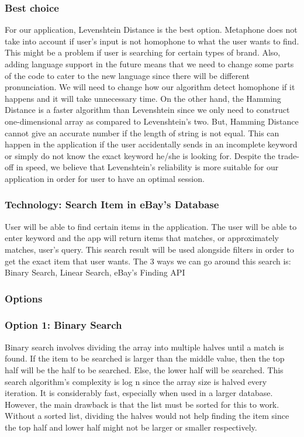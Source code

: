 \documentclass[journal,compsoc, 10pt, draftclsnofoot, onecolumn]{IEEEtran}
\begin{document}
\subsubsection*{Best choice}
For our application, Levenshtein Distance is the best option. Metaphone does not take
into account if user's input is not homophone to what the user wants to find. This
might be a problem if user is searching for certain types of brand. Also, adding
language support in the future means that we need to change some parts of the code to
cater to the new language since there will be different pronunciation. We will need
to change how our algorithm detect homophone if it happens and it will take
unnecessary time. On the other hand, the Hamming Distance is a faster algorithm than
Levenshtein since we only need to construct one-dimensional array as compared to
Levenshtein's two. But, Hamming Distance cannot give an accurate number if the length
of string is not equal. This can happen in the application if the user accidentally
sends in an incomplete keyword or simply do not know the exact keyword he/she is
looking for. Despite the trade-off in speed, we believe that Levenshtein's
reliability is more suitable for our application in order for user to have an optimal
session.

\subsubsection{Technology: Search Item in eBay's Database}
User will be able to find certain items in the application. The user will be able to
enter keyword and the app will return items that matches, or approximately matches,
user's query. This search result will be used alongside filters in order to get the
exact item that user wants.
The 3 ways we can go around this search is: Binary Search, Linear Search, eBay's
Finding API

\subsubsection*{Options}
\subsubsection*{Option 1: Binary Search}
Binary search involves dividing the array into multiple halves until a match is
found. If the item to be searched is larger than the middle value, then the top half
will be the half to be searched. Else, the lower half will be searched. This search
algorithm's complexity is log n since the array size is halved every iteration. It is
considerably fast, especially when used in a larger database. However, the main
drawback is that the list must be sorted for this to work. Without a sorted list,
dividing the halves would not help finding the item since the top half and lower half
might not be larger or smaller respectively.
\end{document}
